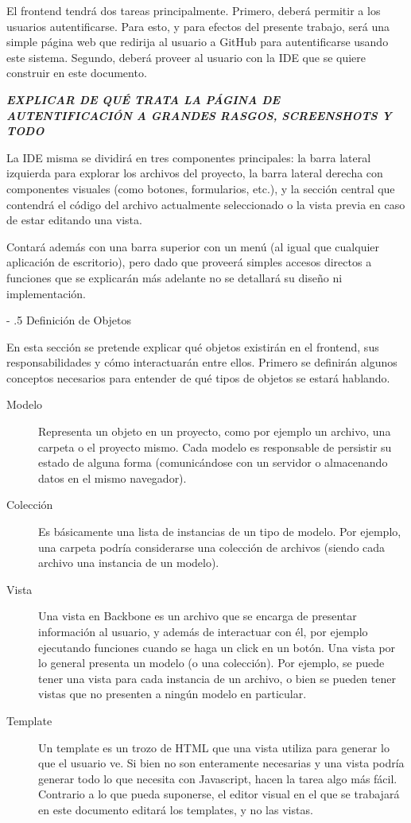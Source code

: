 \documentclass[12pt,titlepage,]{article}
\makeatletter
\renewcommand\paragraph{%
   \@startsection{paragraph}{4}{0mm}%
      {-\baselineskip}%
      {.5\baselineskip}%
      {\normalfont\normalsize\bfseries}}
\makeatother
\begin{document}
El frontend tendrá dos tareas principalmente. Primero, deberá permitir a
los usuarios autentificarse. Para esto, y para efectos del presente
trabajo, será una simple página web que redirija al usuario a GitHub
para autentificarse usando este sistema. Segundo, deberá proveer al
usuario con la IDE que se quiere construir en este documento.

\textbf{\emph{EXPLICAR DE QUÉ TRATA LA PÁGINA DE AUTENTIFICACIÓN A
GRANDES RASGOS, SCREENSHOTS Y TODO}}

La IDE misma se dividirá en tres componentes principales: la barra
lateral izquierda para explorar los archivos del proyecto, la barra
lateral derecha con componentes visuales (como botones, formularios,
etc.), y la sección central que contendrá el código del archivo
actualmente seleccionado o la vista previa en caso de estar editando una
vista.

Contará además con una barra superior con un menú (al igual que
cualquier aplicación de escritorio), pero dado que proveerá simples
accesos directos a funciones que se explicarán más adelante no se
detallará su diseño ni implementación.

\paragraph{Definición de Objetos}

\label{section:object-definition}

En esta sección se pretende explicar qué objetos existirán en el
frontend, sus responsabilidades y cómo interactuarán entre ellos.
Primero se definirán algunos conceptos necesarios para entender de qué
tipos de objetos se estará hablando.

\begin{description}
\item[Modelo]
Representa un objeto en un proyecto, como por ejemplo un archivo, una
carpeta o el proyecto mismo. Cada modelo es responsable de persistir su
estado de alguna forma (comunicándose con un servidor o almacenando
datos en el mismo navegador).
\item[Colección]
Es básicamente una lista de instancias de un tipo de modelo. Por
ejemplo, una carpeta podría considerarse una colección de archivos
(siendo cada archivo una instancia de un modelo).
\item[Vista]
Una vista en Backbone es un archivo que se encarga de presentar
información al usuario, y además de interactuar con él, por ejemplo
ejecutando funciones cuando se haga un click en un botón. Una vista por
lo general presenta un modelo (o una colección). Por ejemplo, se puede
tener una vista para cada instancia de un archivo, o bien se pueden
tener vistas que no presenten a ningún modelo en particular.
\item[Template]
Un template es un trozo de HTML que una vista utiliza para generar lo
que el usuario ve. Si bien no son enteramente necesarias y una vista
podría generar todo lo que necesita con Javascript, hacen la tarea algo
más fácil. Contrario a lo que pueda suponerse, el editor visual en el
que se trabajará en este documento editará los templates, y no las
vistas.
\end{description}
\end{document}
